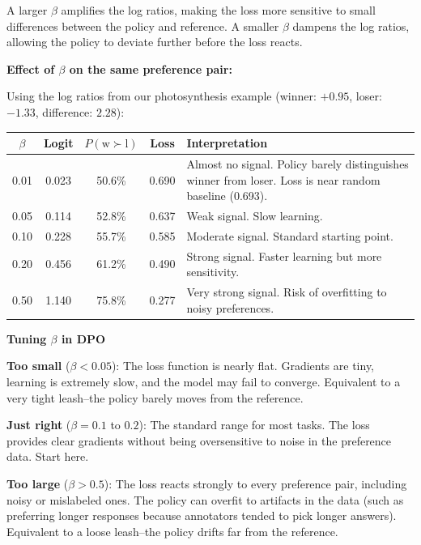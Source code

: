 \begin{chapterenv}
A larger $\beta$ amplifies the log ratios, making the loss more sensitive to small differences between the policy and reference. A smaller $\beta$ dampens the log ratios, allowing the policy to deviate further before the loss reacts.

\textbf{Effect of $\beta$ on the same preference pair:}

Using the log ratios from our photosynthesis example (winner: $+0.95$, loser: $-1.33$, difference: $2.28$):

\begin{center}
\begin{tabular}{ccccl}
\toprule
$\beta$ & \textbf{Logit} & $P(\text{w} \succ \text{l})$ & \textbf{Loss} & \textbf{Interpretation} \\
\midrule
0.01 & 0.023 & 50.6\% & 0.690 & Almost no signal. Policy barely distinguishes winner from loser. Loss is near random baseline (0.693). \\
0.05 & 0.114 & 52.8\% & 0.637 & Weak signal. Slow learning. \\
0.10 & 0.228 & 55.7\% & 0.585 & Moderate signal. Standard starting point. \\
0.20 & 0.456 & 61.2\% & 0.490 & Strong signal. Faster learning but more sensitivity. \\
0.50 & 1.140 & 75.8\% & 0.277 & Very strong signal. Risk of overfitting to noisy preferences. \\
\bottomrule
\end{tabular}
\end{center}

\begin{infobox}
\textbf{Tuning $\beta$ in DPO}

\textbf{Too small} ($\beta < 0.05$): The loss function is nearly flat. Gradients are tiny, learning is extremely slow, and the model may fail to converge. Equivalent to a very tight leash--the policy barely moves from the reference.

\textbf{Just right} ($\beta = 0.1$ to $0.2$): The standard range for most tasks. The loss provides clear gradients without being oversensitive to noise in the preference data. Start here.

\textbf{Too large} ($\beta > 0.5$): The loss reacts strongly to every preference pair, including noisy or mislabeled ones. The policy can overfit to artifacts in the data (such as preferring longer responses because annotators tended to pick longer answers). Equivalent to a loose leash--the policy drifts far from the reference.


\end{infobox}
\end{chapterenv}
